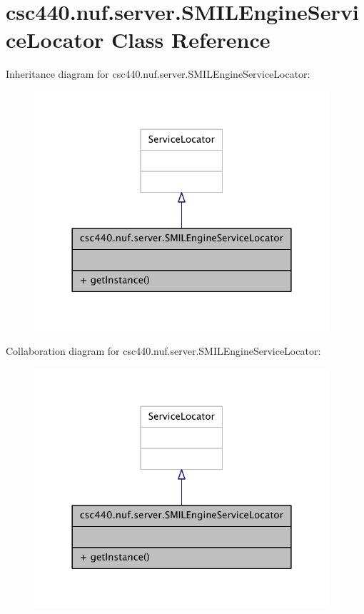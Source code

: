 \hypertarget{classcsc440_1_1nuf_1_1server_1_1_s_m_i_l_engine_service_locator}{\section{csc440.\-nuf.\-server.\-S\-M\-I\-L\-Engine\-Service\-Locator Class Reference}
\label{classcsc440_1_1nuf_1_1server_1_1_s_m_i_l_engine_service_locator}
}


Inheritance diagram for csc440.\-nuf.\-server.\-S\-M\-I\-L\-Engine\-Service\-Locator\-:
\nopagebreak
\begin{figure}[H]
\begin{center}
\leavevmode
\includegraphics[width=310pt]{classcsc440_1_1nuf_1_1server_1_1_s_m_i_l_engine_service_locator__inherit__graph}
\end{center}
\end{figure}


Collaboration diagram for csc440.\-nuf.\-server.\-S\-M\-I\-L\-Engine\-Service\-Locator\-:
\nopagebreak
\begin{figure}[H]
\begin{center}
\leavevmode
\includegraphics[width=310pt]{classcsc440_1_1nuf_1_1server_1_1_s_m_i_l_engine_service_locator__coll__graph}
\end{center}
\end{figure}
